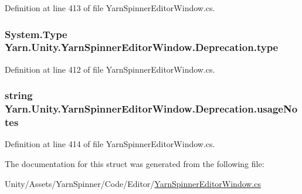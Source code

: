 Definition at line 413 of file Yarn\-Spinner\-Editor\-Window.\-cs.

\hypertarget{a00088_a750904df254223bf3131c39017f90a0b}{
\subsubsection[{type}]{\setlength{\rightskip}{0pt plus 5cm}System.\-Type Yarn.\-Unity.\-Yarn\-Spinner\-Editor\-Window.\-Deprecation.\-type}}\label{a00088_a750904df254223bf3131c39017f90a0b}


Definition at line 412 of file Yarn\-Spinner\-Editor\-Window.\-cs.

\hypertarget{a00088_ac23509be7ae6b43a3e2154dd430954a7}{
\subsubsection[{usage\-Notes}]{\setlength{\rightskip}{0pt plus 5cm}string Yarn.\-Unity.\-Yarn\-Spinner\-Editor\-Window.\-Deprecation.\-usage\-Notes}}\label{a00088_ac23509be7ae6b43a3e2154dd430954a7}


Definition at line 414 of file Yarn\-Spinner\-Editor\-Window.\-cs.



The documentation for this struct was generated from the following file\-:\begin{DoxyCompactItemize}
\item 
Unity/\-Assets/\-Yarn\-Spinner/\-Code/\-Editor/\hyperlink{a00273}{Yarn\-Spinner\-Editor\-Window.\-cs}\end{DoxyCompactItemize}

